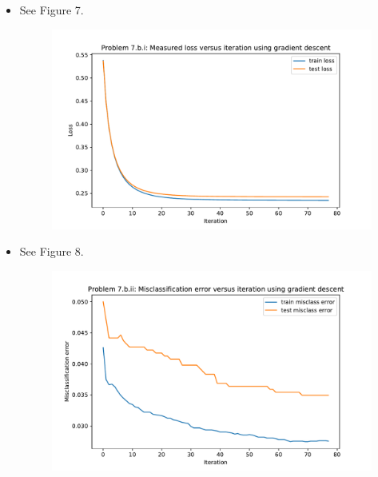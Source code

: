 \begin{itemize}
    \item See Figure 7.
    \begin{figure}[h!]
	\centering
	\includegraphics[width=0.5\linewidth]{images/P7_b_i.pdf}
	\caption{}
    \end{figure}
    \item See Figure 8.
    \begin{figure}[h!]
	\centering
	\includegraphics[width=0.5\linewidth]{images/P7_b_ii.pdf}
	\caption{}
    \end{figure}
\end{itemize}
